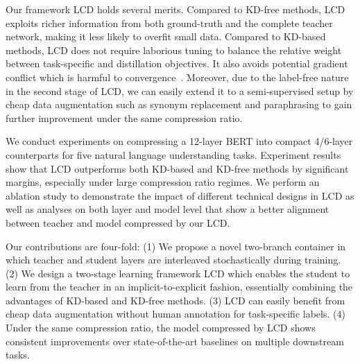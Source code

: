 Our framework LCD holds several merits. Compared to KD-free methods, LCD exploits richer information from both ground-truth and the complete teacher network, making it less likely to overfit small data. Compared to KD-based methods, LCD does not require 
laborious tuning to balance the relative weight between task-specific and distillation objectives. It also avoids potential gradient conflict which is harmful to convergence~\cite{gaml}. Moreover, 
due to the label-free nature in the second stage of LCD, we can easily extend it to a semi-supervised setup by cheap data augmentation such as synonym replacement and paraphrasing to gain further improvement under the same compression ratio.


We conduct experiments on compressing a 12-layer BERT into compact 4/6-layer counterparts for five natural language understanding tasks. Experiment results show that LCD outperforms both KD-based and KD-free methods by significant margins, especially under large 
compression ratio regimes. We perform an ablation study to demonstrate the impact of different technical designs in LCD as well as analyses on both layer and model level that show a better alignment 
between teacher and model compressed by our LCD.

Our contributions are four-fold: (1) We propose a novel two-branch container in which teacher and student layers are interleaved stochastically during training.
(2) We design a two-stage learning framework LCD which enables the student to learn from the teacher in an implicit-to-explicit fashion, essentially combining the advantages of KD-based and KD-free methods.
(3) LCD can easily benefit from cheap data augmentation without human annotation for task-specific labels.
(4) Under the same compression ratio, the model compressed by LCD shows consistent improvements over state-of-the-art baselines on multiple downstream tasks.
